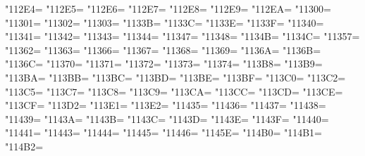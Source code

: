 \XeTeXcharclass"112E4=\KclassCM
\XeTeXcharclass"112E5=\KclassCM
\XeTeXcharclass"112E6=\KclassCM
\XeTeXcharclass"112E7=\KclassCM
\XeTeXcharclass"112E8=\KclassCM
\XeTeXcharclass"112E9=\KclassCM
\XeTeXcharclass"112EA=\KclassCM
\XeTeXcharclass"11300=\KclassCM
\XeTeXcharclass"11301=\KclassCM
\XeTeXcharclass"11302=\KclassCM
\XeTeXcharclass"11303=\KclassCM
\XeTeXcharclass"1133B=\KclassCM
\XeTeXcharclass"1133C=\KclassCM
\XeTeXcharclass"1133E=\KclassCM
\XeTeXcharclass"1133F=\KclassCM
\XeTeXcharclass"11340=\KclassCM
\XeTeXcharclass"11341=\KclassCM
\XeTeXcharclass"11342=\KclassCM
\XeTeXcharclass"11343=\KclassCM
\XeTeXcharclass"11344=\KclassCM
\XeTeXcharclass"11347=\KclassCM
\XeTeXcharclass"11348=\KclassCM
\XeTeXcharclass"1134B=\KclassCM
\XeTeXcharclass"1134C=\KclassCM
\XeTeXcharclass"11357=\KclassCM
\XeTeXcharclass"11362=\KclassCM
\XeTeXcharclass"11363=\KclassCM
\XeTeXcharclass"11366=\KclassCM
\XeTeXcharclass"11367=\KclassCM
\XeTeXcharclass"11368=\KclassCM
\XeTeXcharclass"11369=\KclassCM
\XeTeXcharclass"1136A=\KclassCM
\XeTeXcharclass"1136B=\KclassCM
\XeTeXcharclass"1136C=\KclassCM
\XeTeXcharclass"11370=\KclassCM
\XeTeXcharclass"11371=\KclassCM
\XeTeXcharclass"11372=\KclassCM
\XeTeXcharclass"11373=\KclassCM
\XeTeXcharclass"11374=\KclassCM
\XeTeXcharclass"113B8=\KclassCM
\XeTeXcharclass"113B9=\KclassCM
\XeTeXcharclass"113BA=\KclassCM
\XeTeXcharclass"113BB=\KclassCM
\XeTeXcharclass"113BC=\KclassCM
\XeTeXcharclass"113BD=\KclassCM
\XeTeXcharclass"113BE=\KclassCM
\XeTeXcharclass"113BF=\KclassCM
\XeTeXcharclass"113C0=\KclassCM
\XeTeXcharclass"113C2=\KclassCM
\XeTeXcharclass"113C5=\KclassCM
\XeTeXcharclass"113C7=\KclassCM
\XeTeXcharclass"113C8=\KclassCM
\XeTeXcharclass"113C9=\KclassCM
\XeTeXcharclass"113CA=\KclassCM
\XeTeXcharclass"113CC=\KclassCM
\XeTeXcharclass"113CD=\KclassCM
\XeTeXcharclass"113CE=\KclassCM
\XeTeXcharclass"113CF=\KclassCM
\XeTeXcharclass"113D2=\KclassCM
\XeTeXcharclass"113E1=\KclassCM
\XeTeXcharclass"113E2=\KclassCM
\XeTeXcharclass"11435=\KclassCM
\XeTeXcharclass"11436=\KclassCM
\XeTeXcharclass"11437=\KclassCM
\XeTeXcharclass"11438=\KclassCM
\XeTeXcharclass"11439=\KclassCM
\XeTeXcharclass"1143A=\KclassCM
\XeTeXcharclass"1143B=\KclassCM
\XeTeXcharclass"1143C=\KclassCM
\XeTeXcharclass"1143D=\KclassCM
\XeTeXcharclass"1143E=\KclassCM
\XeTeXcharclass"1143F=\KclassCM
\XeTeXcharclass"11440=\KclassCM
\XeTeXcharclass"11441=\KclassCM
\XeTeXcharclass"11443=\KclassCM
\XeTeXcharclass"11444=\KclassCM
\XeTeXcharclass"11445=\KclassCM
\XeTeXcharclass"11446=\KclassCM
\XeTeXcharclass"1145E=\KclassCM
\XeTeXcharclass"114B0=\KclassCM
\XeTeXcharclass"114B1=\KclassCM
\XeTeXcharclass"114B2=\KclassCM
